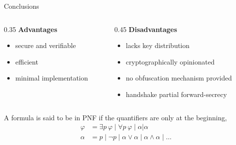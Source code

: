 \documentclass[light]{presenta}
\begin{document}
\begin{frame}{Conclusions}
  \begin{columns}
    \begin{column}[t]{0.35\paperwidth}
      \justifying
      \textcolor{blue!180}{\textbf{Advantages}}
      \begin{itemize}
        \item secure and verifiable
        \item efficient
        \item minimal implementation
      \end{itemize}
    \end{column}
    \pause
    \begin{column}[t]{0.45\paperwidth}
      \justifying
      \textcolor{red!120}{\textbf{Disadvantages}}
      \begin{itemize}
        \item lacks key distribution
        \item cryptographically opinionated
        \item no obfuscation mechanism provided
        \item handshake partial forward-secrecy
      \end{itemize}
    \end{column}
  \end{columns}
\end{frame}

\begin{frame}
  \begin{definition}
    A formula is said to be in PNF if the quantifiers are only at the beginning, \ie
    \begin{align*}
      \varphi & = \exists p\ \varphi \mid \forall p\ \varphi \mid \alpha \vert \alpha \\
      \alpha & = p \mid \neg p \mid \alpha \lor \alpha \mid \alpha \land \alpha \mid \dots
    \end{align*}
  \end{definition}
\end{frame}


\end{document}
